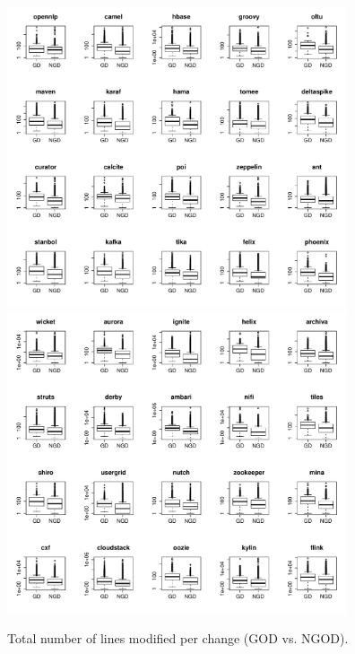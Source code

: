 \begin{figure}[tb]
	\centering
	\includegraphics[width=100mm]{figures/chapter4/rq3_god_churn_logged_1}
	\includegraphics[width=100mm]{figures/chapter4/rq3_god_churn_logged_2}
	\caption{Total number of lines modified per change (GOD vs. NGOD).}
	\label{figure:total_number_of_lines_changed_god_vs_ngod}
\end{figure}


